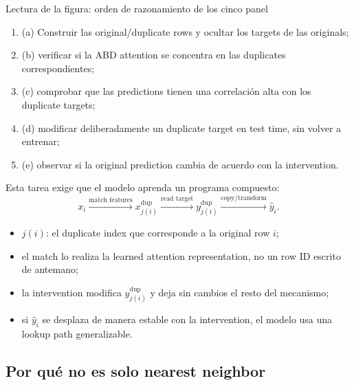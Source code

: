 \documentclass[a4paper]{article}
\begin{document}
\begin{knowledgebox}{Lectura de la figura: orden de razonamiento de los cinco panel}
\begin{enumerate}
  \item (a) Construir las original/duplicate rows y ocultar los targets de las originals;
  \item (b) verificar si la ABD attention se concentra en las duplicates correspondientes;
  \item (c) comprobar que las predictions tienen una correlación alta con los duplicate targets;
  \item (d) modificar deliberadamente un duplicate target en test time, sin volver a entrenar;
  \item (e) observar si la original prediction cambia de acuerdo con la intervention.
\end{enumerate}
\end{knowledgebox}

Esta tarea exige que el modelo aprenda un programa compuesto:
\[
x_i\xrightarrow{\text{match features}}
x_{j(i)}^{\mathrm{dup}}
\xrightarrow{\text{read target}}
y_{j(i)}^{\mathrm{dup}}
\xrightarrow{\text{copy/transform}}
\widehat y_i.
\]

\begin{itemize}
  \item $j(i)$: el duplicate index que corresponde a la original row $i$;
  \item el match lo realiza la learned attention representation, no un row ID escrito de antemano;
  \item la intervention modifica $y_{j(i)}^{\mathrm{dup}}$ y deja sin cambios el resto del mecanismo;
  \item si $\widehat y_i$ se desplaza de manera estable con la intervention, el modelo usa una lookup path generalizable.
\end{itemize}


\subsection{Por qué no es solo nearest neighbor}
\end{document}
